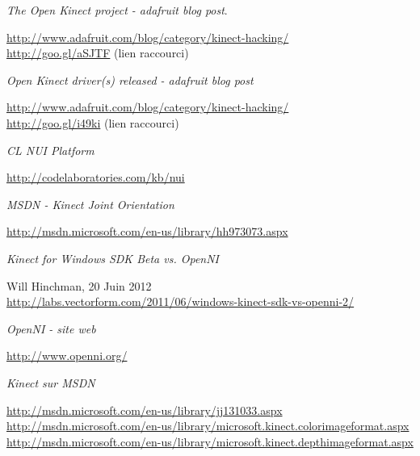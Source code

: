 \begin{thebibliography}{200}
\begin{footnotesize}
  \emph{The Open Kinect project - adafruit blog post}. \\
  \begin{tiny}
  \url{http://www.adafruit.com/blog/category/kinect-hacking/}\\
  \url{http://goo.gl/aSJTF} (lien raccourci)
  \end{tiny}

  \emph{Open Kinect driver(s) released - adafruit blog post}\\
  \begin{tiny}
  \url{http://www.adafruit.com/blog/category/kinect-hacking/}\\
  \url{http://goo.gl/i49ki} (lien raccourci)
  \end{tiny}

  \emph{CL NUI Platform}\\
  \begin{tiny}
  \url{http://codelaboratories.com/kb/nui}
  \end{tiny}
  
  \emph{MSDN - Kinect Joint Orientation}\\
  \begin{tiny}
  \url{http://msdn.microsoft.com/en-us/library/hh973073.aspx}
  \end{tiny}
  
  \emph{Kinect for Windows SDK Beta vs. OpenNI}\\
  \begin{tiny}
  Will Hinchman, 20 Juin 2012\\
  \url{http://labs.vectorform.com/2011/06/windows-kinect-sdk-vs-openni-2/}
  \end{tiny}

  \emph{OpenNI - site web}\\
  \begin{tiny}
  \url{http://www.openni.org/}
  \end{tiny}
  
  \emph{Kinect sur MSDN}\\
  \begin{tiny}
  \url{http://msdn.microsoft.com/en-us/library/jj131033.aspx}
  \url{http://msdn.microsoft.com/en-us/library/microsoft.kinect.colorimageformat.aspx}
  \url{http://msdn.microsoft.com/en-us/library/microsoft.kinect.depthimageformat.aspx}
  \end{tiny}


\end{footnotesize}
\end{thebibliography}
